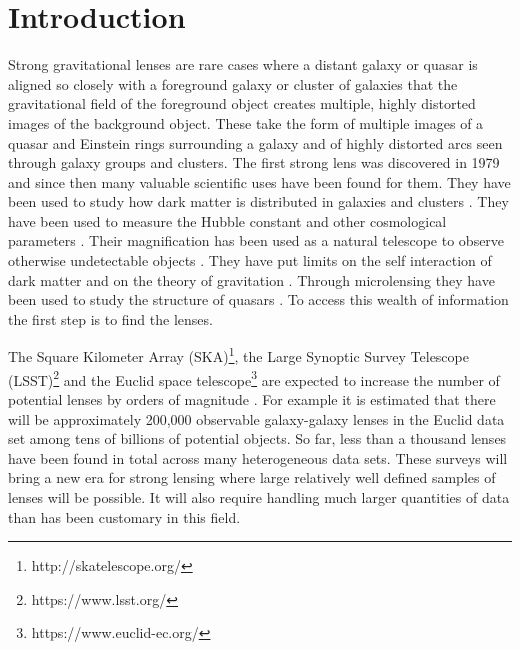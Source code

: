 \documentclass[useAMS,usenatbib]{mnras}
\begin{document}
\section{Introduction}
\label{sec:introduction}

Strong gravitational lenses are rare cases where a distant galaxy or quasar is aligned so closely with a foreground galaxy or cluster of galaxies  that the gravitational field of the foreground object creates multiple, highly distorted images of the background object.  These take the form of multiple images of a quasar and Einstein rings surrounding a galaxy and of highly distorted arcs seen through galaxy groups and clusters.  The first strong lens was discovered in 1979 \citep{1979Natur.279..381W} and since then many valuable scientific uses have been found for them.  They have been used to study how dark matter is distributed in galaxies and clusters \citep[e.g.][]{1991ApJ...373..354K,2001ApJ...554.1216C,2002ApJ...568L...5K,2003ApJ...587..143R,2003ApJ...583..606K,2005MNRAS.360.1333W,2005ApJ...623...31D,2009MNRAS.392..945V,2016MNRAS.463.3115T}.  They have been used to measure the Hubble constant and other cosmological parameters \citep[e.g.][]{1964MNRAS.128..307R,1992ARA&A..30..311B,2000ApJ...544...98W,2013ApJ...766...70S,2016A&ARv..24...11T}.
Their magnification has been used as a natural telescope to observe otherwise undetectable objects \citep[e.g][]{2007ApJ...671.1196M,2017MNRAS.464.4823B,2016ApJ...833..264S}.   They have put limits on the self interaction of dark matter and on the theory of gravitation \citep{0004-637X-606-2-819}.  Through microlensing they have been used to study the structure of quasars \citep{2008ApJ...689..755M,2008ApJ...673...34P,2011ApJ...729...34B}.   To access this wealth of information the first step is to find the lenses.

The Square Kilometer Array (SKA)\footnote{http://skatelescope.org/}, the Large Synoptic Survey Telescope (LSST)\footnote{https://www.lsst.org/} and the Euclid space telescope\footnote{https://www.euclid-ec.org/} are expected to increase the number of potential lenses by orders of magnitude \citep{collett_15,euclidSLWGwhitepaper,2015aska.confE..84M,2010MNRAS.405.2579O}.   For example it is estimated that there will be approximately 200,000 observable galaxy-galaxy lenses in the Euclid data set among tens of billions of potential objects.  So far, less than a thousand lenses have been found in total across many heterogeneous data sets.  These surveys will bring a new era for strong lensing where large relatively well defined samples of lenses will be possible.  It will also require handling much larger quantities of data than has been customary in this field.
\end{document}

